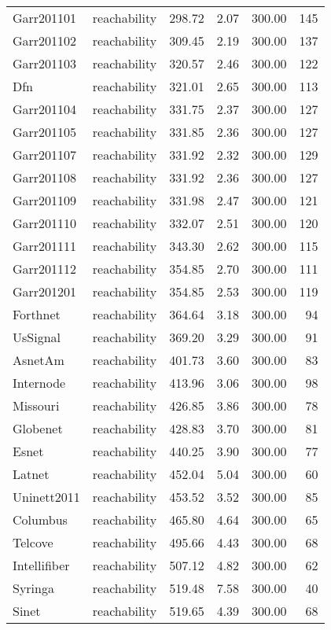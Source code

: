 \begin{tabular}{llrrrr}
Garr201101 & reachability & 298.72 & 2.07 & 300.00 & 145 \\
Garr201102 & reachability & 309.45 & 2.19 & 300.00 & 137 \\
Garr201103 & reachability & 320.57 & 2.46 & 300.00 & 122 \\
Dfn & reachability & 321.01 & 2.65 & 300.00 & 113 \\
Garr201104 & reachability & 331.75 & 2.37 & 300.00 & 127 \\
Garr201105 & reachability & 331.85 & 2.36 & 300.00 & 127 \\
Garr201107 & reachability & 331.92 & 2.32 & 300.00 & 129 \\
Garr201108 & reachability & 331.92 & 2.36 & 300.00 & 127 \\
Garr201109 & reachability & 331.98 & 2.47 & 300.00 & 121 \\
Garr201110 & reachability & 332.07 & 2.51 & 300.00 & 120 \\
Garr201111 & reachability & 343.30 & 2.62 & 300.00 & 115 \\
Garr201112 & reachability & 354.85 & 2.70 & 300.00 & 111 \\
Garr201201 & reachability & 354.85 & 2.53 & 300.00 & 119 \\
Forthnet & reachability & 364.64 & 3.18 & 300.00 & 94 \\
UsSignal & reachability & 369.20 & 3.29 & 300.00 & 91 \\
AsnetAm & reachability & 401.73 & 3.60 & 300.00 & 83 \\
Internode & reachability & 413.96 & 3.06 & 300.00 & 98 \\
Missouri & reachability & 426.85 & 3.86 & 300.00 & 78 \\
Globenet & reachability & 428.83 & 3.70 & 300.00 & 81 \\
Esnet & reachability & 440.25 & 3.90 & 300.00 & 77 \\
Latnet & reachability & 452.04 & 5.04 & 300.00 & 60 \\
Uninett2011 & reachability & 453.52 & 3.52 & 300.00 & 85 \\
Columbus & reachability & 465.80 & 4.64 & 300.00 & 65 \\
Telcove & reachability & 495.66 & 4.43 & 300.00 & 68 \\
Intellifiber & reachability & 507.12 & 4.82 & 300.00 & 62 \\
Syringa & reachability & 519.48 & 7.58 & 300.00 & 40 \\
Sinet & reachability & 519.65 & 4.39 & 300.00 & 68 \\

\end{tabular}

